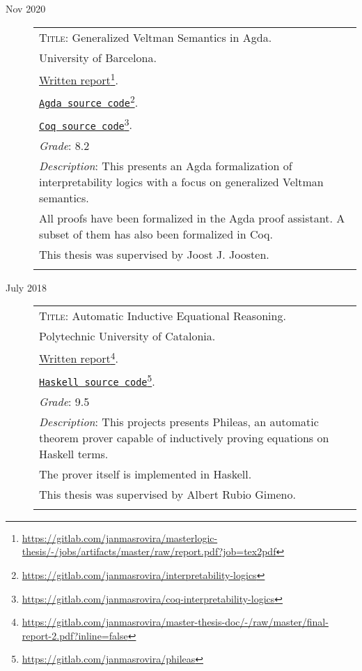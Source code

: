 \documentclass[a4paper,11pt]{article}
\newcommand{\fnlink}[2]{\href{#1}{#2}\footnote{\url{#1}}}
\begin{document}
\begin{description}
\item[Nov 2020]
\begin{minipage}{\textwidth}

  \begin{tabular}{|p{12cm}}

    \textsc{Title}: Generalized Veltman Semantics in Agda. \\
    University of Barcelona. \\
    \fnlink{https://gitlab.com/janmasrovira/masterlogic-thesis/-/jobs/artifacts/master/raw/report.pdf?job=tex2pdf}{Written report}. \\
    \fnlink{https://gitlab.com/janmasrovira/interpretability-logics}{\texttt{Agda source code}}. \\
    \fnlink{https://gitlab.com/janmasrovira/coq-interpretability-logics}{\texttt{Coq source code}}. \\
    \textit{Grade}: 8.2 \\
    \textit{Description}: This presents an Agda formalization of interpretability logics with a focus on generalized Veltman semantics.
    \\All proofs have been formalized in the Agda proof assistant. A subset of them has also been formalized in Coq.
    \\This thesis was supervised by Joost J. Joosten. \\
    \multicolumn{1}{c}{} \\

  \end{tabular}
\end{minipage}

\item[July 2018]
  \begin{minipage}{\textwidth}
    \begin{tabular}{|p{12cm}}
      \textsc{Title}: Automatic Inductive Equational Reasoning. \\
      Polytechnic University of Catalonia. \\
      \fnlink{https://gitlab.com/janmasrovira/master-thesis-doc/-/raw/master/final-report-2.pdf?inline=false}{Written report}. \\
      \fnlink{https://gitlab.com/janmasrovira/phileas}{\texttt{Haskell source code}}. \\
      \textit{Grade}: 9.5 \\
      \textit{Description}: This projects presents Phileas, an automatic
      theorem prover capable of inductively proving equations on Haskell
      terms.
      \\The prover itself is implemented in Haskell.
      \\This thesis was supervised by Albert Rubio Gimeno. \\
      \multicolumn{1}{c}{} \\

    \end{tabular}
  \end{minipage}

\end{description}
\end{document}
